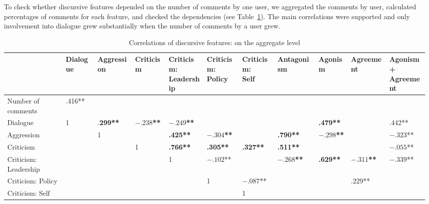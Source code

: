 To check whether discursive features depended on the number of comments by one user, we aggregated the comments by user, calculated percentages of comments for each feature, and checked the dependencies (see Table~\cref{tab:discursiveFeaturesCorrelationsAggregate}). The main correlations were supported and only involvement into dialogue grew substantially when the number of comments by a user grew.

\begin{table}[ht]%
	\centering
	\caption{Correlations of discursive features: on the aggregate level}%
	\label{tab:discursiveFeaturesCorrelationsAggregate}%
	\begin{adjustbox}{width=1\textwidth}
		\small
		\begin{tabular}{ l  l  l  l  l  l  l  l  l  l  l }%
			\toprule
			& Dialogue & Aggression & Criticism & \makecell[l]{Criticism:\\Leadership} & \makecell[l]{Criticism:\\Policy} & \makecell[l]{Criticism:\\Self} & Antagonism &  Agonism & Agreement & \makecell[l]{Agonism +\\Agreement} \\
			\hline
			Number of comments & .416** & & &  & & & & & & \\
			
			Dialogue & 1 & .\textbf{299**} & \textbf{\(-.238\)**} & \textbf{\(-.249\)**} & & & & \textbf{.479**} & & .442**\\
			
			Aggression & & 1 & & \textbf{.425**} & \textbf{\(-.304\)**} & & \textbf{.790**} & \textbf{\(-.298\)**} &  & \(-.323\)**\\
			
			Criticism & & & 1 & \textbf{.766**} & \textbf{.305**} & \textbf{.327**} & \textbf{.511**} & & & \(-.055\)** \\
			
			Criticism: Leadership & & & & 1 & \(-.102\)** & & \textbf{\(-.268\)**} & \textbf{.629**} & \textbf{\(-.311\)**} & \(-.339\)**\\
			
			Criticism: Policy & & & & & 1 & \(-.087\)** & & & \(.229\)** & \\
			
			Criticism: Self & & & & & & 1 & & & & \\
			

\end{tabular}
\end{adjustbox}
\end{table}
